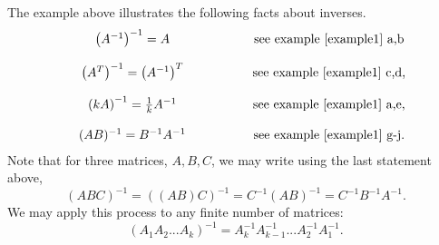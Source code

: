 \documentclass{ximera}
\begin{document}
The example above illustrates the following facts about inverses. \\
\[
\begin{array}{ccc}
&\left(A^{-1}\right)^{-1}=A &\hspace{1.5cm} \text{see example \ref{example1} a,b}\\ \\
&\left(A^{T}\right)^{-1}= \left(A^{-1}\right)^{T} &\hspace{1.5cm} \text{see example \ref{example1} c,d,} \\ \\
&\left(kA\right)^{-1}= \frac{1}{k}A^{-1} &\hspace{1.5cm} \text{see example \ref{example1} a,e,}\\ \\
&(AB)^{-1}= B^{-1}A^{-1} &\hspace{1.5cm} \text{see example \ref{example1} g-j}.
\end{array}
\]
Note that for three matrices, $A, B, C$, we may write using the last statement above,
\begin{equation*}
(ABC)^{-1} = \left(\left(AB\right)C\right)^{-1} = C^{-1} \left(AB\right)^{-1} = C^{-1}B^{-1}A^{-1}.
\end{equation*}
We may apply this process to any finite number of matrices:
\begin{equation*}
\left(A_{1}A_{2}...A_{k}\right)^{-1}= A_{k}^{-1} A_{k-1}^{-1}...A_{2}^{-1}A_{1}^{-1}.
\end{equation*}
\end{document}
